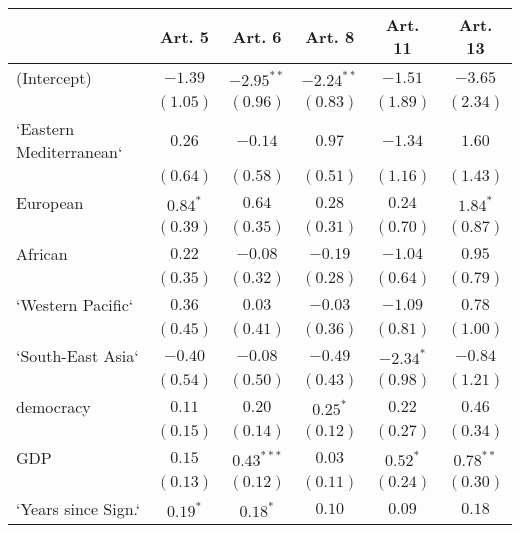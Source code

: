 
\begin{table}[!h]
\begin{center}
\begin{tabular}{l c c c c c }
\toprule
 & Art. 5 & Art. 6 & Art. 8 & Art. 11 & Art. 13 \\
\midrule
(Intercept)             & $-1.39$      & $-2.95^{**}$ & $-2.24^{**}$ & $-1.51$      & $-3.65$      \\
                        & $(1.05)$     & $(0.96)$     & $(0.83)$     & $(1.89)$     & $(2.34)$     \\
`Eastern Mediterranean` & $0.26$       & $-0.14$      & $0.97$       & $-1.34$      & $1.60$       \\
                        & $(0.64)$     & $(0.58)$     & $(0.51)$     & $(1.16)$     & $(1.43)$     \\
European                & $0.84^{*}$   & $0.64$       & $0.28$       & $0.24$       & $1.84^{*}$   \\
                        & $(0.39)$     & $(0.35)$     & $(0.31)$     & $(0.70)$     & $(0.87)$     \\
African                 & $0.22$       & $-0.08$      & $-0.19$      & $-1.04$      & $0.95$       \\
                        & $(0.35)$     & $(0.32)$     & $(0.28)$     & $(0.64)$     & $(0.79)$     \\
`Western Pacific`       & $0.36$       & $0.03$       & $-0.03$      & $-1.09$      & $0.78$       \\
                        & $(0.45)$     & $(0.41)$     & $(0.36)$     & $(0.81)$     & $(1.00)$     \\
`South-East Asia`       & $-0.40$      & $-0.08$      & $-0.49$      & $-2.34^{*}$  & $-0.84$      \\
                        & $(0.54)$     & $(0.50)$     & $(0.43)$     & $(0.98)$     & $(1.21)$     \\
democracy               & $0.11$       & $0.20$       & $0.25^{*}$   & $0.22$       & $0.46$       \\
                        & $(0.15)$     & $(0.14)$     & $(0.12)$     & $(0.27)$     & $(0.34)$     \\
GDP                     & $0.15$       & $0.43^{***}$ & $0.03$       & $0.52^{*}$   & $0.78^{**}$  \\
                        & $(0.13)$     & $(0.12)$     & $(0.11)$     & $(0.24)$     & $(0.30)$     \\
`Years since Sign.`     & $0.19^{*}$   & $0.18^{*}$   & $0.10$       & $0.09$       & $0.18$       \\

\end{tabular}
\end{center}
\end{table}

